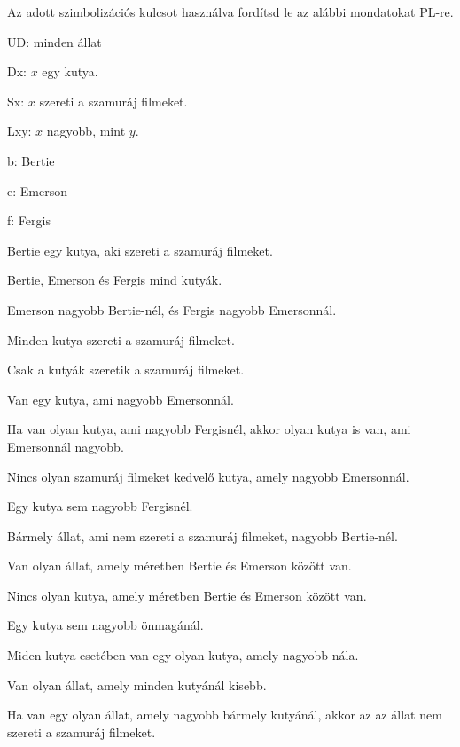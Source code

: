 \problempart Az adott szimbolizációs kulcsot használva fordítsd le az alábbi mondatokat PL-re.
\begin{ekey}
\item[UD:] minden állat
\item[Dx:] $x$ egy kutya.
\item[Sx:] $x$ szereti a szamuráj filmeket.
\item[Lxy:] $x$ nagyobb, mint $y$.
\item[b:] Bertie
\item[e:] Emerson
\item[f:] Fergis
\end{ekey}
\begin{earg}
\item Bertie egy kutya, aki szereti a szamuráj filmeket.
\item Bertie, Emerson és Fergis mind kutyák.
\item Emerson nagyobb Bertie-nél, és Fergis nagyobb Emersonnál.
\item Minden kutya szereti a szamuráj filmeket.
\item Csak a kutyák szeretik a szamuráj filmeket.
\item Van egy kutya, ami nagyobb Emersonnál.
\item Ha van olyan kutya, ami nagyobb Fergisnél, akkor olyan kutya is van, ami Emersonnál nagyobb.
\item Nincs olyan szamuráj filmeket kedvelő kutya, amely nagyobb Emersonnál.
\item Egy kutya sem nagyobb Fergisnél.
\item Bármely állat, ami nem szereti a szamuráj filmeket, nagyobb Bertie-nél.
\item Van olyan állat, amely méretben Bertie és Emerson között van.
\item Nincs olyan kutya, amely méretben Bertie és Emerson között van.
\item Egy kutya sem nagyobb önmagánál.
\item Miden kutya esetében van egy olyan kutya, amely nagyobb nála. 
\item Van olyan állat, amely minden kutyánál kisebb.
\item Ha van egy olyan állat, amely nagyobb bármely kutyánál, akkor az az állat nem szereti a szamuráj filmeket.
\end{earg}

